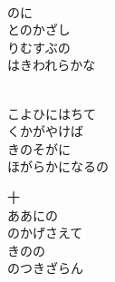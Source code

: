 \documentclass[10pt,b5j]{tarticle} %
\begin{document}
\begin{enumerate}
\begin{minipage}[c]{\blocksize}
        \vspace{\linespace}
        \item~\\
        のに\\
        とのかざし\\
        りむすぶの\\
        はきわれらかな
        
        \vspace{\linespace}
        \item~\\
        こよひにはちて\\
        くかがやけば\\
        きのそがに\\
        ほがらかになるの
        
    \end{minipage}
    \begin{minipage}[c]{\blocksize}
        
        \vspace{\linespace}
        \item[十]~\\
        ああにの\\
        のかげさえて\\
        きのの\\
        のつきざらん
    
    \end{minipage}
\end{enumerate} %
\end{document}
